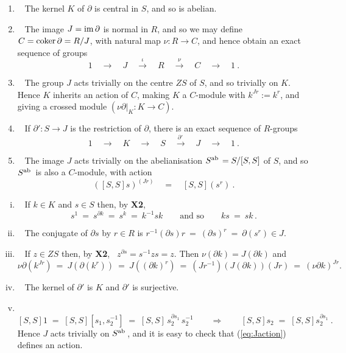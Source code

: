 \begin{lem}\quad
\begin{enumerate}[{\rm (i)}]
\item~  
The kernel $K$ of  $\partial$  is  central in $S$, and so is abelian.
\item~  
The image $J = \mathrm{im}\,\partial$ is normal in $R$,
and so we may define  $C = \mathrm{coker}\,\partial = R/J$,
with natural map $\nu : R \to C$, 
and hence obtain an exact sequence of groups
$$
1 \quad \longrightarrow \quad 
J \quad \stackrel{\iota}{\longrightarrow} \quad 
R \quad \stackrel{\nu}{\longrightarrow} \quad 
C \quad \longrightarrow \quad 
1~.
$$
\item~
The group  $J$ acts trivially on the centre  $ZS$  of  $S$,
and so trivially on $K$.
Hence  $K$  inherits an action of $C$, making $K$ a $C$-module 
with  $k^{Jr} := k^r$, 
and giving a crossed module $(\nu\partial|_{K} : K \to C)$.
\item~
If  $\partial' : S \to J$ is the restriction of $\partial$,
there is an exact sequence of $R$-groups
$$
1 \quad \longrightarrow \quad 
K \quad \longrightarrow \quad 
S \quad \stackrel{\partial'\,}{\longrightarrow} \quad 
J \quad \longrightarrow \quad 
1~.
$$
\item~
The image  $J$ acts trivially on the abelianisation  
$S^{\mathrm{ab}\,} = S/[S,S]$  of  $S$, and so  $S^{\mathrm{ab}\,}$
is also a $C$-module, with action
\begin{equation} \label{eq:Jaction}
([S,S]s)^{(Jr)} \quad = \quad [S,S](s^r)~.
\end{equation}
\end{enumerate}
\end{lem}
\begin{pf}\quad
\begin{enumerate}[(i)]
\item~
If  $k \in K$  and  $s \in S$ then, by \textbf{X2},
$$
s^1 ~=~ s^{\partial k} ~=~ s^k ~=~ k^{-1}sk
\qquad \text{and so} \qquad
ks ~=~ sk\,.
$$
\item~
The conjugate of $\partial s$ by $r \in R$ is 
$r^{-1}(\partial s)r ~=~ (\partial s)^r ~=~ \partial(s^r) \in J$. 
\item~
If  $z \in ZS$ then, by \textbf{X2}, ~$z^{\partial s} = s^{-1}zs = z$. 
Then $\nu(\partial k) = J(\partial k)$ and 
$$
\nu\partial(k^{Jr}) ~=~ J(\partial(k^r)) ~=~ J((\partial k)^r) 
~=~ (Jr^{-1})(J(\partial k))(Jr) ~=~ (\nu\partial k)^{Jr}. 
$$
\item~
The kernel of $\partial'$ is $K$ and $\partial'$ is surjective.
\item~
$$
[S,S]1 \;=\; [S,S][s_1,s_2^{-1}] \;=\; [S,S]\,s_2^{\partial s_1}\,s_2^{-1}
\qquad\Rightarrow\qquad
[S,S]s_2 \;=\; [S,S]s_2^{\partial s_1}~.
$$
Hence $J$ acts trivially on $S^{\mathrm{ab}\,}$, and it is easy to check that 
(\ref{eq:Jaction}) defines an action.
\end{enumerate}
\end{pf}


